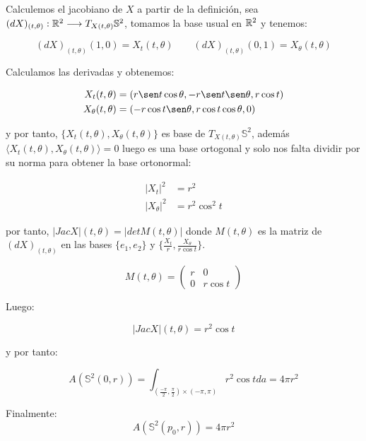 \begin{remark}
Calculemos el jacobiano de $X$ a partir de la definición, sea $(dX)_{(t, \theta)}: \mathbb{R}^2 \longrightarrow T_{X(t,\theta)} \mathbb{S}^2$, tomamos la base usual en $\mathbb{R}^2$ y tenemos:

\begin{equation*}
    (dX)_{(t, \theta)}(1,0) = X_t(t, \theta) \qquad (dX)_{(t, \theta)}(0,1) = X_\theta(t, \theta) 
\end{equation*}

Calculamos las derivadas y obtenemos:

\begin{align*}
    X_t(t, \theta) &= (r\sen t\cos\theta, -r\sen t\sen\theta, r\cos t) \\
    X_\theta(t, \theta) &= (-r\cos t\sen\theta, r\cos t\cos\theta, 0)
\end{align*}

y por tanto, $\{ X_t(t, \theta), X_\theta(t, \theta) \}$ es base de $T_{X(t,\theta)} \mathbb{S}^2$, además $\langle X_t(t, \theta), X_\theta(t, \theta) \rangle = 0$ luego es una base ortogonal y solo nos falta dividir por su norma para obtener la base ortonormal:

\begin{align*}
    |X_t|^2 &= r^2 \\
    |X_\theta|^2 &= r^2\cos^2t
\end{align*}

por tanto, $|Jac X|(t,\theta) = |det M(t,\theta)|$  donde $M(t,\theta)$ es la matriz de $(dX)_{(t, \theta)}$ en las bases $\{e_1, e_2\}$ y $\{ \frac{X_t}{r}, \frac{X_\theta}{r\cos t} \}$.

\begin{equation*}
    M(t,\theta) = \left( {\begin{array}{cc}
        r & 0 \\
        0 & r\cos t
    \end{array} } \right)
\end{equation*}

Luego:

\begin{equation*}
    |Jac X|(t,\theta) = r^2\cos t
\end{equation*}

y por tanto:

\begin{equation*}
    A(\mathbb{S}^2(0,r)) = \int_{(\frac{-\pi}{2}, \frac{\pi}{2}) \times (-\pi, \pi)} r^2\cos t da = 4\pi r^2 
\end{equation*}

Finalmente:
\begin{equation*}
    A(\mathbb{S}^2(p_0,r)) = 4\pi r^2 
\end{equation*}
\end{remark}

